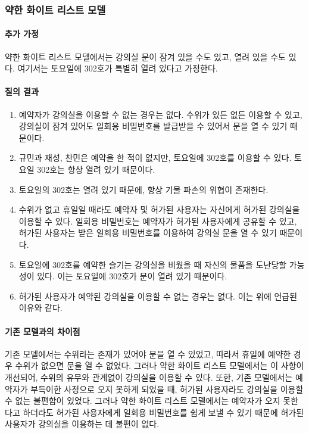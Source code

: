 \documentclass[11pt,a4paper]{article}
\begin{document}
\subsubsection{약한 화이트 리스트 모델}

\paragraph{추가 가정}
약한 화이트 리스트 모델에서는 강의실 문이 잠겨 있을 수도 있고, 열려 있을 수도 있다. 여기서는 토요일에 302호가 특별히 열려 있다고 가정한다.

\paragraph{질의 결과}
\begin{enumerate}
\item 예약자가 강의실을 이용할 수 없는 경우는 없다. 수위가 있든 없든 이용할 수 있고, 강의실이 잠겨 있어도 일회용 비밀번호를 발급받을 수 있어서 문을 열 수 있기 때문이다.
\item 규민과 재성, 찬민은 예약을 한 적이 없지만, 토요일에 302호를 이용할 수 있다. 토요일 302호는 항상 열려 있기 때문이다.
\item 토요일의 302호는 열려 있기 때문에, 항상 기물 파손의 위협이 존재한다.
\item 수위가 없고 휴일일 때라도 예약자 및 허가된 사용자는 자신에게 허가된 강의실을 이용할 수 있다. 일회용 비밀번호는 예약자가 허가된 사용자에게 공유할 수 있고, 허가된 사용자는 받은 일회용 비밀번호를 이용하여 강의실 문을 열 수 있기 때문이다.
\item 토요일에 302호를 예약한 슬기는 강의실을 비웠을 때 자신의 물품을 도난당할 가능성이 있다. 이는 토요일에 302호가 문이 열려 있기 때문이다.
\item 허가된 사용자가 예약된 강의실을 이용할 수 없는 경우는 없다. 이는 위에 언급된 이유와 같다.
\end{enumerate}

\paragraph{기존 모델과의 차이점}
\hfill\break
기존 모델에서는 수위라는 존재가 있어야 문을 열 수 있었고, 따라서 휴일에 예약한
경우 수위가 없으면 문을 열 수 없었다. 그러나 약한 화이트 리스트 모델에서는 이
사항이 개선되어, 수위의 유무와 관계없이 강의실을 이용할 수 있다.
또한, 기존 모델에서는 예약자가 부득이한 사정으로 오지 못하게 되었을 때, 허가된
사용자라도 강의실을 이용할 수 없는 불편함이 있었다. 그러나 약한 화이트 리스트
모델에서는 예약자가 오지 못한다고 하더라도 허가된 사용자에게 일회용 비밀번호를
쉽게 보낼 수 있기 때문에 허가된 사용자가 강의실을 이용하는 데 불편이 없다.
\end{document}
